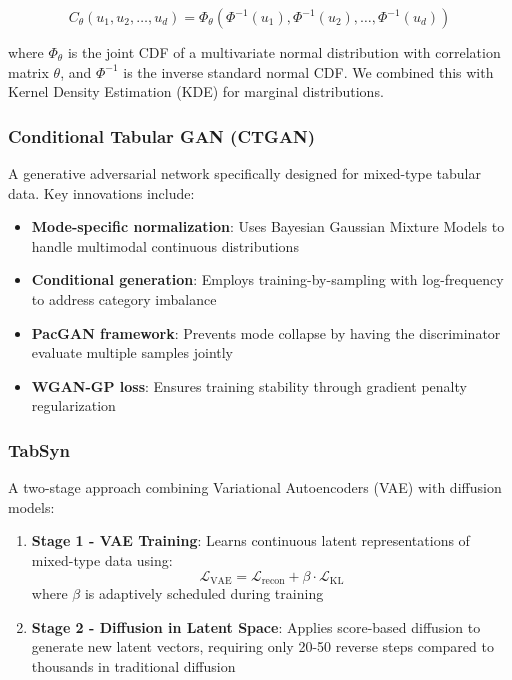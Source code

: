 \documentclass[conference]{IEEEtran}
\begin{document}
\begin{equation}
C_\theta(u_1, u_2, \ldots, u_d) = \Phi_\theta(\Phi^{-1}(u_1), \Phi^{-1}(u_2), \ldots, \Phi^{-1}(u_d))
\end{equation}

where $\Phi_\theta$ is the joint CDF of a multivariate normal distribution with correlation matrix $\theta$, and $\Phi^{-1}$ is the inverse standard normal CDF. We combined this with Kernel Density Estimation (KDE) for marginal distributions.

\subsubsection{Conditional Tabular GAN (CTGAN)} \cite{xu2019modeling}
A generative adversarial network specifically designed for mixed-type tabular data. Key innovations include:
\begin{itemize}
    \item \textbf{Mode-specific normalization}: Uses Bayesian Gaussian Mixture Models to handle multimodal continuous distributions
    \item \textbf{Conditional generation}: Employs training-by-sampling with log-frequency to address category imbalance
    \item \textbf{PacGAN framework}: Prevents mode collapse by having the discriminator evaluate multiple samples jointly
    \item \textbf{WGAN-GP loss}: Ensures training stability through gradient penalty regularization
\end{itemize}

\subsubsection{TabSyn} \cite{zhang2024mixed}
A two-stage approach combining Variational Autoencoders (VAE) with diffusion models:
\begin{enumerate}
    \item \textbf{Stage 1 - VAE Training}: Learns continuous latent representations of mixed-type data using:
    \begin{equation}
    \mathcal{L}_{\text{VAE}} = \mathcal{L}_{\text{recon}} + \beta \cdot \mathcal{L}_{\text{KL}}
    \end{equation}
    where $\beta$ is adaptively scheduled during training
    \item \textbf{Stage 2 - Diffusion in Latent Space}: Applies score-based diffusion to generate new latent vectors, requiring only 20-50 reverse steps compared to thousands in traditional diffusion
\end{enumerate}
\end{document}
